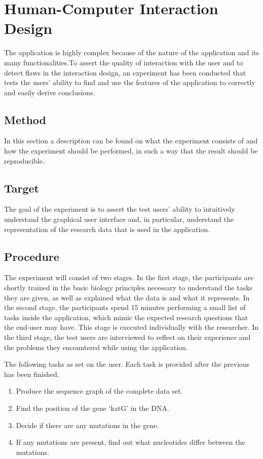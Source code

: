 \chapter{Human-Computer Interaction Design}
The application is highly complex because of the nature of the application and its many functionalities.To assert the quality of interaction with the user and to detect flaws in the interaction design, an experiment has been conducted that tests the users’ ability to find and use the features of the application to correctly and easily derive conclusions.

\section{Method}
In this section a description can be found on what the experiment consists of and how the experiment should be performed, in such a way that the result should be reproducible.

\section{Target}
The goal of the experiment is to assert the test users’ ability to intuitively understand the graphical user interface and, in particular, understand the representation of the research data that is used in the application.

\section{Procedure}
The experiment will consist of two stages. In the first stage, the participants are shortly trained in the basic biology principles necessary to understand the tasks they are given, as well as explained what the data is and what it represents.
In the second stage, the participants spend 15 minutes performing a small list of tasks inside the application, which mimic the expected research questions that the end-user may have. This stage is executed individually with the researcher.
In the third stage, the test users are interviewed to reflect on their experience and the problems they encountered while using the application.

\par
The following tasks as set on the user. Each task is provided after the previous has been finished.

\begin{enumerate}
	\item Produce the sequence graph of the complete data set.
	\item Find the position of the gene ‘katG’ in the DNA.
	\item Decide if there are any mutations in the gene.
	\item If any mutations are present, find out what nucleotides differ between the mutations.
\end{enumerate}


